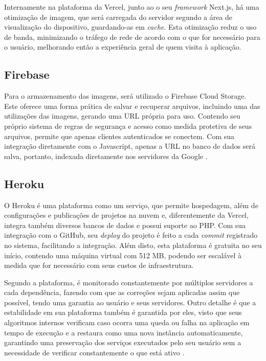 Internamente na plataforma da Vercel, junto ao o seu \textit{framework} Next.js, há uma otimização de imagem, que será carregada do servidor segundo a área de visualização do dispositivo, guardando-as em \textit{cache}. Esta otimização reduz o uso de banda, minimizando o tráfego de rede de acordo com o que for necessário para o usuário, melhorando então a experiência geral de quem visita à aplicação.

\subsection{Firebase}
Para o armazenamento das imagens, será utilizado o Firebase Cloud Storage. Este oferece uma forma prática de salvar e recuperar arquivos, incluindo uma das utilizações das imagens, gerando uma URL própria para uso. Contendo seu próprio sistema de regras de segurança e acesso como medida protetiva de seus arquivos, permite que apenas clientes autenticados se conectem. Com sua integração diretamente com o Javascript, apenas a URL no banco de dados será salva, portanto, indexada diretamente nos servidores da Google \cite{FIREBASE}.

\subsection{Heroku}
O Heroku é uma plataforma como um serviço, que permite hospedagem, além de configurações e publicações de projetos na nuvem e, diferentemente da Vercel, integra também diversos bancos de dados e possui suporte ao PHP. Com sua integração com o GitHub, seu \textit{deploy} do projeto é feito a cada \textit{commit} registrado no sistema, facilitando a integração. Além disto, esta plataforma é gratuita no seu início, contendo uma máquina virtual com 512 MB, podendo ser escalável à medida que for necessário com seus custos de infraestrutura. 

Segundo a plataforma, é monitorado constantemente por múltiplos servidores a cada dependência, fazendo com que as correções sejam aplicadas assim que possível, tendo uma garantia ao usuário e seus servidores.  Outro detalhe é que a estabilidade em sua plataforma também é garantida por eles, visto que seus algoritmos internos verificam caso ocorra uma queda ou falha na aplicação em tempo de execução e a restaura como uma nova instância automaticamente, garantindo uma preservação dos serviços executados pelo seu usuário sem a necessidade de verificar constantemente o que está ativo \cite{HEROKU}.

